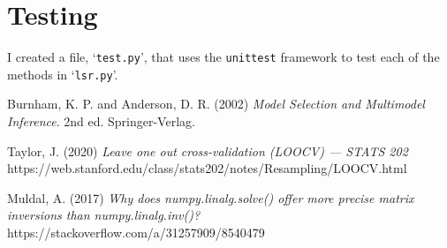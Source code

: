 \documentclass[onecolumn, 12pt, a4paper]{article}
\begin{document}
\section{Testing}

I created a file, `\texttt{test.py}', that uses the
\texttt{unittest} framework to test each of the methods
in `\texttt{lsr.py}'.

\clearpage
\begin{thebibliography}{9}

    Burnham, K. P. and Anderson, D. R. (2002)
    \textit{Model Selection and Multimodel Inference}.
    2nd ed. Springer-Verlag.

    Taylor, J. (2020)
    \textit{Leave one out cross-validation (LOOCV) --- STATS 202}
    https://web.stanford.edu/class/stats202/notes/Resampling/LOOCV.html

    Muldal, A. (2017)
    \textit{Why does numpy.linalg.solve() offer more precise matrix inversions than numpy.linalg.inv()?}
    https://stackoverflow.com/a/31257909/8540479



\end{thebibliography}
    
\end{document}
